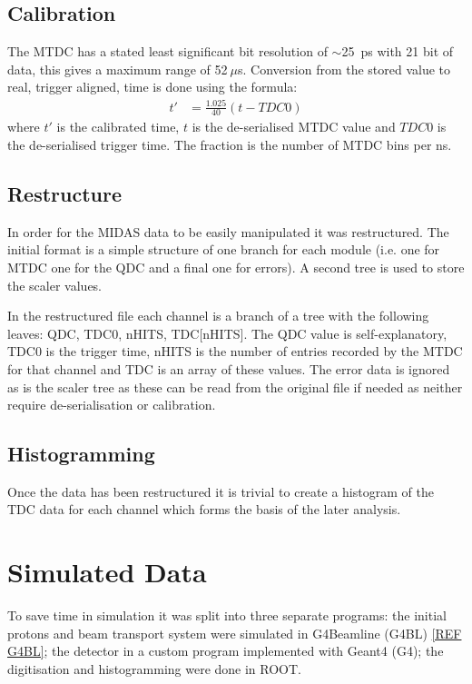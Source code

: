 \documentclass[]{article}
\newcommand{\ms}{$~\mu$s}
\begin{document}
\subsection{Calibration} %
\label{sub:calibration}
The MTDC has a stated least significant bit resolution of $\sim$25~ps with 21 bit of data, this gives a maximum range of 52\ms{}. Conversion from the stored value to real, trigger aligned, time is done using the formula:
\begin{align}\label{equ:tdc_calibration}
	t'   &= \frac{1.025}{40}(t - TDC0)
\end{align}
where $t'$ is the calibrated time, $t$ is the de-serialised MTDC value and $TDC0$ is the de-serialised trigger time. The fraction is the number of MTDC bins per ns.
\subsection{Restructure} %
\label{sub:restructure}
In order for the MIDAS data to be easily manipulated it was restructured. The initial format is a simple structure of one branch for each module (i.e. one for MTDC one for the QDC and a final one for errors). A second tree is used to store the scaler values. 

In the restructured file each channel is a branch of a tree with the following leaves: QDC, TDC0, nHITS, TDC[nHITS]. The QDC value is self-explanatory, TDC0 is the trigger time, nHITS is the number of entries recorded by the MTDC for that channel and TDC is an array of these values. The error data is ignored as is the scaler tree as these can be read from the original file if needed as neither require de-serialisation or calibration.
\subsection{Histogramming} %
\label{sub:Histogramming}
Once the data has been restructured it is trivial to create a histogram of the TDC data for each channel which forms the basis of the later analysis.
\section{Simulated Data} %
\label{sec:simulated_data}
To save time in simulation it was split into three separate programs: the initial protons and beam transport system were simulated in G4Beamline (G4BL) \ref{REF G4BL}; the detector in a custom program implemented with Geant4 (G4); the digitisation and histogramming were done in ROOT.
\end{document}
